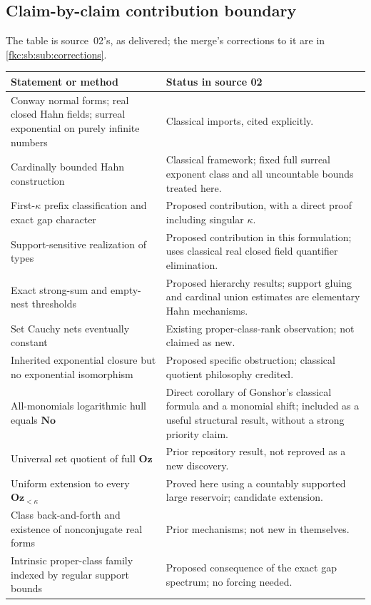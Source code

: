 \documentclass[11pt,letterpaper]{article}
\numberwithin{equation}{section}
\theoremstyle{definition}
\theoremstyle{remark}
\newcommand{\No}{\mathbf{No}}
\newcommand{\Oz}{\mathbf{Oz}}
\newcommand{\Ok}{\Oz_{<\kappa}}
\begin{document}
\subsection{Claim-by-claim contribution boundary}\label{fkc:sb:sub:claims}
The table is source~02's, as delivered; the merge's corrections to it are in \cref{fkc:sb:sub:corrections}.
\begin{center}
\small
\begin{longtable}{@{}p{}p{}@{}}
\toprule
Statement or method & Status in source 02 \\
\midrule\endhead
Conway normal forms; real closed Hahn fields; surreal exponential on purely infinite numbers & Classical imports, cited explicitly. \\
Cardinally bounded Hahn construction & Classical framework; fixed full surreal exponent class and all uncountable bounds treated here. \\
First-$\kappa$ prefix classification and exact gap character & Proposed contribution, with a direct proof including singular $\kappa$. \\
Support-sensitive realization of types & Proposed contribution in this formulation; uses classical real closed field quantifier elimination. \\
Exact strong-sum and empty-nest thresholds & Proposed hierarchy results; support gluing and cardinal union estimates are elementary Hahn mechanisms. \\
Set Cauchy nets eventually constant & Existing proper-class-rank observation; not claimed as new. \\
Inherited exponential closure but no exponential isomorphism & Proposed specific obstruction; classical quotient philosophy credited. \\
All-monomials logarithmic hull equals $\No$ & Direct corollary of Gonshor's classical formula and a monomial shift; included as a useful structural result, without a strong priority claim. \\
Universal set quotient of full $\Oz$ & Prior repository result, not reproved as a new discovery. \\
Uniform extension to every $\Ok$ & Proved here using a countably supported large reservoir; candidate extension. \\
Class back-and-forth and existence of nonconjugate real forms & Prior mechanisms; not new in themselves. \\
Intrinsic proper-class family indexed by regular support bounds & Proposed consequence of the exact gap spectrum; no forcing needed. \\
\bottomrule
\end{longtable}
\end{center}
\end{document}
